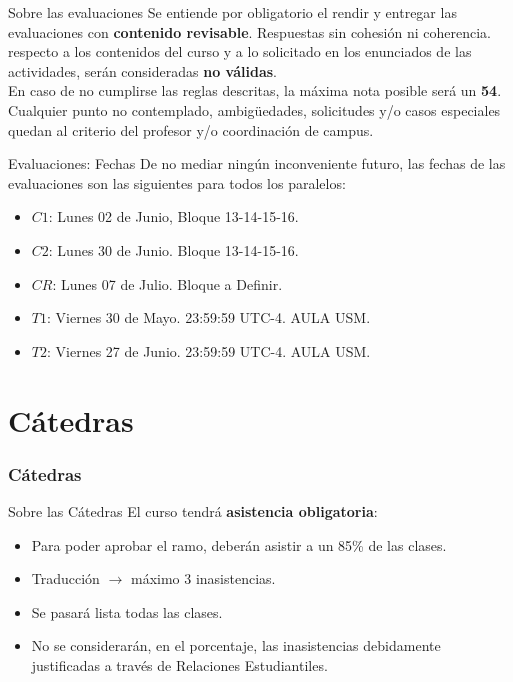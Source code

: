 \documentclass{beamer}
\begin{document}
\begin{frame}{Sobre las evaluaciones}
Se entiende por obligatorio el rendir y entregar las evaluaciones con \textbf{contenido revisable}. Respuestas sin cohesión ni coherencia. respecto a los contenidos del curso y a lo solicitado en los enunciados de las actividades, serán consideradas \textbf{no válidas}.\\[1em]

En caso de no cumplirse las reglas descritas, la máxima nota posible será un \textbf{54}.\\[1em]

Cualquier punto no contemplado, ambigüedades, solicitudes y/o casos especiales quedan al criterio del profesor y/o coordinación de campus.
\end{frame}



\begin{frame}{Evaluaciones: Fechas}
De no mediar ningún inconveniente futuro, las fechas de las evaluaciones son las siguientes para todos los paralelos:
\begin{itemize}
\item $C1$: Lunes 02 de Junio, Bloque 13-14-15-16.
\item $C2$: Lunes 30 de Junio. Bloque 13-14-15-16.
\item $CR$: Lunes 07 de Julio. Bloque a Definir. \bigskip

\item $T1$: Viernes 30 de Mayo. 23:59:59 UTC-4. AULA USM.
\item $T2$: Viernes 27 de Junio. 23:59:59 UTC-4. AULA USM.\medskip
\end{itemize}

\end{frame}

\part{Cátedras}
\section{Cátedras}
\begin{frame}{Sobre las Cátedras}
El curso tendrá \textbf{asistencia obligatoria}:
\begin{itemize}
\item Para poder aprobar el ramo, deberán asistir a un 85\% de las clases.
\item Traducción $\rightarrow$ máximo 3 inasistencias. 
\item Se pasará lista todas las clases.
\item No se considerarán, en el porcentaje, las inasistencias debidamente justificadas a través de Relaciones Estudiantiles. 
\end{itemize}
\end{frame}
\end{document}
